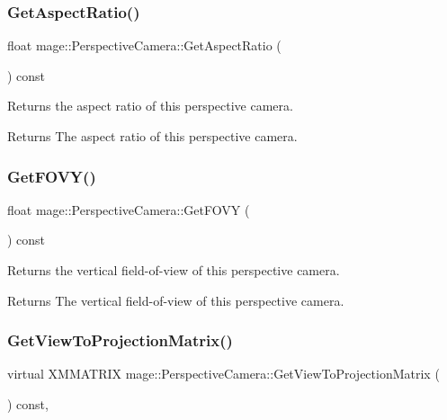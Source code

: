 \subsubsection{\texorpdfstring{Get\+Aspect\+Ratio()}{GetAspectRatio()}}
{\footnotesize\ttfamily float mage\+::\+Perspective\+Camera\+::\+Get\+Aspect\+Ratio (\begin{DoxyParamCaption}{ }\end{DoxyParamCaption}) const}

Returns the aspect ratio of this perspective camera.

\begin{DoxyReturn}{Returns}
The aspect ratio of this perspective camera. 
\end{DoxyReturn}
\hypertarget{classmage_1_1_perspective_camera_a15223034b30ca691c51de8850c033293}{}\label{classmage_1_1_perspective_camera_a15223034b30ca691c51de8850c033293} 
\subsubsection{\texorpdfstring{Get\+F\+O\+V\+Y()}{GetFOVY()}}
{\footnotesize\ttfamily float mage\+::\+Perspective\+Camera\+::\+Get\+F\+O\+VY (\begin{DoxyParamCaption}{ }\end{DoxyParamCaption}) const}

Returns the vertical field-\/of-\/view of this perspective camera.

\begin{DoxyReturn}{Returns}
The vertical field-\/of-\/view of this perspective camera. 
\end{DoxyReturn}
\hypertarget{classmage_1_1_perspective_camera_a83a38a4e8180707df2323130f9cee4a5}{}\label{classmage_1_1_perspective_camera_a83a38a4e8180707df2323130f9cee4a5} 
\subsubsection{\texorpdfstring{Get\+View\+To\+Projection\+Matrix()}{GetViewToProjectionMatrix()}}
{\footnotesize\ttfamily virtual X\+M\+M\+A\+T\+R\+IX mage\+::\+Perspective\+Camera\+::\+Get\+View\+To\+Projection\+Matrix (\begin{DoxyParamCaption}{ }\end{DoxyParamCaption}) const\hspace{0.3cm}{\ttfamily [override]}, {\ttfamily [virtual]}}

